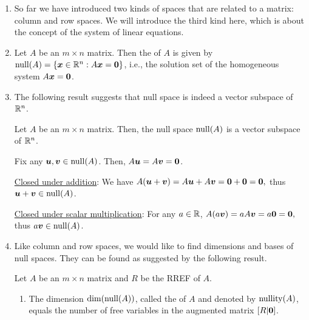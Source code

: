 \begin{enumerate}
\item So far we have introduced two kinds of spaces that are related to a
matrix: column and row spaces. We will introduce the third kind here, which is
about the concept of the system of linear equations.

\item Let \(A\) be an \(m\times n\) matrix. Then the  of \(A\)
is given by \(\operatorname{null}(A)=\{\vb*{x}\in\mathbb{R}^n:A\vb*{x}=\vb*{0}\}\), i.e., the
solution set of the homogeneous system \(A\vb*{x}=\vb*{0}\).

\item The following result suggests that null space is indeed a vector
subspace of \(\mathbb{R}^n\).

\begin{theorem}
\label{thm:null-sp-vec-subsp}
Let \(A\) be an \(m\times n\) matrix. Then, the null space \(\operatorname{null}(A)\) is a
vector subspace of \(\mathbb{R}^n\).
\end{theorem}
\begin{pf}
Fix any \(\vb*{u},\vb*{v}\in \operatorname{null}(A)\). Then, \(A\vb*{u}=A\vb*{v}=\vb*{0}\).

\underline{Closed under addition}: We have
\(A(\vb*{u}+\vb*{v})=A\vb*{u}+A\vb*{v}=\vb*{0}+\vb*{0}=\vb*{0},\) thus
\(\vb*{u}+\vb*{v}\in\operatorname{null}(A)\).

\underline{Closed under scalar multiplication}: For any \(a\in\mathbb{R}\),
\(A(a\vb*{v})=aA\vb*{v}=a\vb*{0}=\vb*{0},\) thus \(a\vb*{v}\in\operatorname{null}(A)\).
\end{pf}

\item Like column and row spaces, we would like to find dimensions and bases of
null spaces. They can be found as suggested by the following result.

\begin{theorem}
\label{thm:null-sp-dim-basis}
Let \(A\) be an \(m\times n\) matrix and \(R\) be the RREF of \(A\).
\begin{enumerate}
\item The dimension \(\dim(\operatorname{null}(A))\), called the  of
\(A\) and denoted by \(\operatorname{nullity}(A)\), equals the number of free variables
in the augmented matrix \([R|\vb*{0}]\).


\end{enumerate}
\end{theorem}
\end{enumerate}
